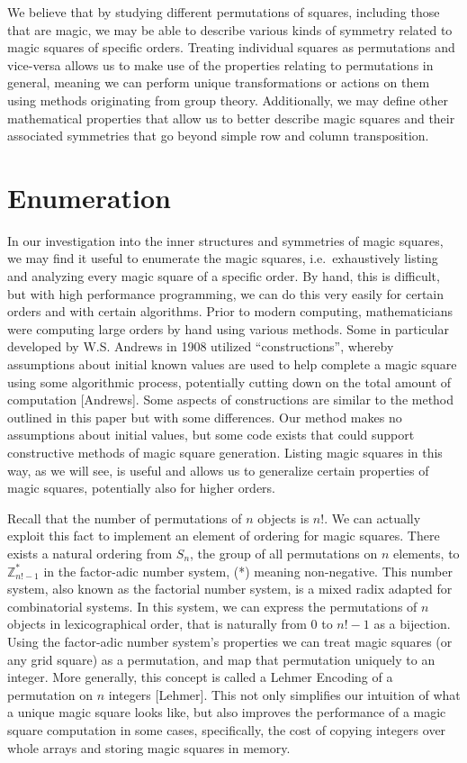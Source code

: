 \documentclass[12pt]{report}
\begin{document}
\par We believe that by studying different permutations of squares, including those that are magic,
we may be able to describe various kinds of symmetry related to magic squares of specific orders.
Treating individual squares as permutations and vice-versa allows us to make use of the properties
relating to permutations in general, meaning we can perform unique transformations or actions on
them using methods originating from group theory. Additionally, we may define other mathematical
properties that allow us to better describe magic squares and their associated symmetries that go
beyond simple row and column transposition.

\section{Enumeration}

\par In our investigation into the inner structures and symmetries of magic squares, we may find it
useful to enumerate the magic squares, i.e.\ exhaustively listing and analyzing every magic square
of a specific order. By hand, this is difficult, but with high performance programming, we can do
this very easily for certain orders and with certain algorithms. Prior to modern computing,
mathematicians were computing large orders by hand using various methods. Some in particular
developed by W.S. Andrews in 1908 utilized ``constructions'', whereby assumptions about initial
known values are used to help complete a magic square using some algorithmic process, potentially
cutting down on the total amount of computation [Andrews]. Some aspects of constructions are
similar to the method outlined in this paper but with some differences. Our method makes no
assumptions about initial values, but some code exists that could support constructive methods of
magic square generation. Listing magic squares in this way, as we will see, is useful and allows us
to generalize certain properties of magic squares, potentially also for higher orders.

\par Recall that the number of permutations of $n$ objects is $n$!. We can actually exploit this
fact to implement an element of ordering for magic squares. There exists a natural ordering from
$S_n$, the group of all permutations on $n$ elements, to $\mathbb{Z}^{*}_{n!-1}$  in the
factor-adic number system, (*) meaning non-negative. This number system, also known as the
factorial number system, is a mixed radix adapted for combinatorial systems. In this system, we can
express the permutations of $n$ objects in lexicographical order, that is naturally from $0$ to
$n!-1$ as a bijection. Using the factor-adic number system's properties we can treat magic squares
(or any grid square) as a permutation, and map that permutation uniquely to an integer. More
generally, this concept is called a Lehmer Encoding of a permutation on $n$ integers [Lehmer]. This
not only simplifies our intuition of what a unique magic square looks like, but also improves the
performance of a magic square computation in some cases, specifically, the cost of copying integers
over whole arrays and storing magic squares in memory.
\end{document}
